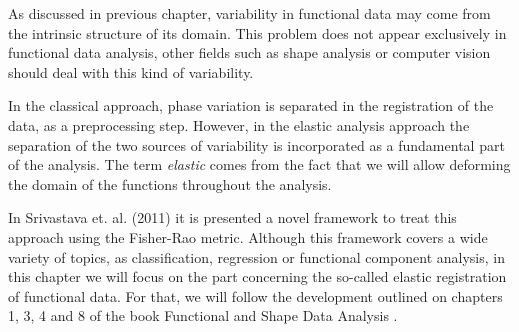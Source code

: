 As discussed in previous chapter, variability in functional data may come
from the intrinsic structure of its domain. This problem does not appear
exclusively in functional data analysis, other fields such as shape analysis or
computer vision should deal with this kind of variability.

In the classical approach, phase variation is separated in the registration of
the data, as a preprocessing step. However, in the elastic analysis approach the
separation of the two sources of variability is incorporated as a fundamental
part of the analysis. The term \textit{elastic} comes from the fact that we will allow
deforming the domain of the functions throughout the analysis.

In Srivastava et. al. (2011)\cite{Srivastava2011} it is presented a novel
framework to treat this approach using the Fisher-Rao metric. Although this
framework covers a wide variety of topics, as classification, regression or
functional component analysis\cite{Tucker2014}, in this chapter we will focus
on the part concerning the so-called elastic registration of functional data.
For that, we will follow the development outlined on chapters 1, 3, 4 and 8 of 
the book Functional and Shape Data Analysis \cite{Srivastava2016}.
